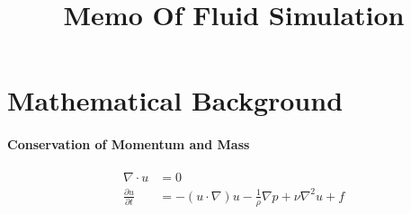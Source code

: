 \documentclass[a4paper, 9pt]{extarticle}
\title{Memo Of Fluid Simulation}
\date{}
\begin{document}
\maketitle

\section{Mathematical Background}
\paragraph{Conservation of Momentum and Mass}
\begin{equation}
    \begin{aligned}
    \nabla \cdot u &= 0 \\
    \frac{\partial{u}}{\partial{t}} &= -(u\cdot \nabla)u - \frac{1}{\rho}\nabla p + \nu \nabla^2u + f\\
    \end{aligned}
\end{equation}
\end{document}

